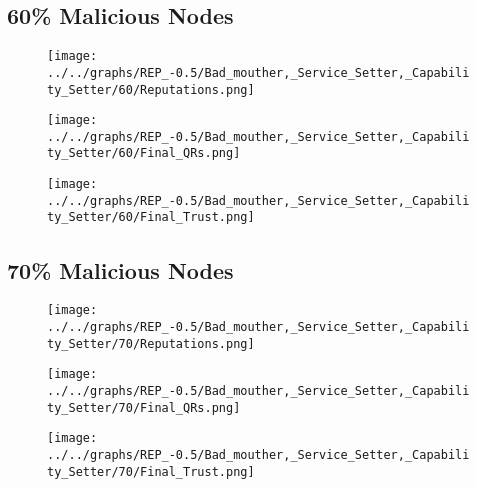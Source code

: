 \begin{minipage}[t]{0.49\columnwidth}
\subsection*{60\% Malicious Nodes}
    \begin{figure}[H]
        \centering
        \texttt{[image: ../../graphs/REP\_-0.5/Bad\_mouther,\_Service\_Setter,\_Capability\_Setter/60/Reputations.png]}
    \end{figure}
    \begin{figure}[H]
        \centering
        \texttt{[image: ../../graphs/REP\_-0.5/Bad\_mouther,\_Service\_Setter,\_Capability\_Setter/60/Final\_QRs.png]}
    \end{figure}
\end{minipage}
\begin{minipage}[t]{0.49\columnwidth}
    \begin{figure}[H]
        \centering
        \texttt{[image: ../../graphs/REP\_-0.5/Bad\_mouther,\_Service\_Setter,\_Capability\_Setter/60/Final\_Trust.png]}
    \end{figure}
\end{minipage}

\begin{minipage}[t]{0.49\columnwidth}
\subsection*{70\% Malicious Nodes}
    \begin{figure}[H]
        \centering
        \texttt{[image: ../../graphs/REP\_-0.5/Bad\_mouther,\_Service\_Setter,\_Capability\_Setter/70/Reputations.png]}
    \end{figure}
    \begin{figure}[H]
        \centering
        \texttt{[image: ../../graphs/REP\_-0.5/Bad\_mouther,\_Service\_Setter,\_Capability\_Setter/70/Final\_QRs.png]}
    \end{figure}
\end{minipage}
\begin{minipage}[t]{0.49\columnwidth}
    \begin{figure}[H]
        \centering
        \texttt{[image: ../../graphs/REP\_-0.5/Bad\_mouther,\_Service\_Setter,\_Capability\_Setter/70/Final\_Trust.png]}
    \end{figure}
\end{minipage}
\newpage

